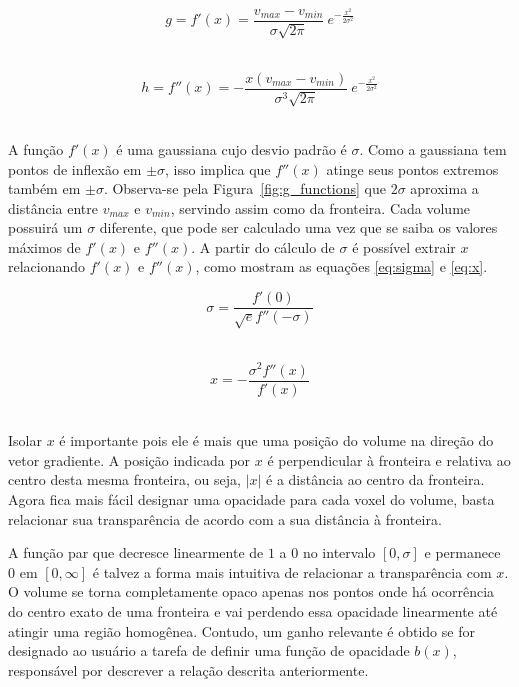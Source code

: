 \begin{equation} \label{eq:first}
	g = f'(x) = \frac{v_{max} - v_{min}}{\sigma\sqrt{2\pi}}\ e^{-\frac{x^{2}}{2\sigma^{2}}}
\end{equation} \

\begin{equation} \label{eq:second}
	h = f''(x) = -\frac{x(v_{max} - v_{min})}{\sigma^{3}\sqrt{2\pi}}\ e^{-\frac{x^{2}}{2\sigma^{2}}}
\end{equation} \

	A função $f'(x)$ é uma gaussiana cujo desvio padrão é $\sigma$. Como a gaussiana tem pontos de inflexão em $\pm\sigma$, isso implica que $f''(x)$ atinge seus pontos extremos também em $\pm\sigma$. Observa-se pela Figura~\ref{fig:g_functions} que $2\sigma$ aproxima a distância entre $v_{max}$ e $v_{min}$, servindo assim como  da fronteira. Cada volume possuirá um $\sigma$ diferente, que pode ser calculado uma vez que se saiba os valores máximos de $f'(x)$ e $f''(x)$. A partir do cálculo de $\sigma$ é possível extrair $x$ relacionando $f'(x)$ e $f''(x)$, como mostram as equações \eqref{eq:sigma} e \eqref{eq:x}.
	
\begin{equation} \label{eq:sigma}
	\sigma = \frac{f'(0)}{\sqrt{e}f''(-\sigma)}
\end{equation} \

\begin{equation} \label{eq:x}
	x = -\frac{\sigma^{2}f''(x)}{f'(x)}
\end{equation} \

	Isolar $x$ é importante pois ele é mais que uma posição do volume na direção do vetor gradiente. A posição indicada por $x$ é perpendicular à fronteira e relativa ao centro desta mesma fronteira, ou seja, $|x|$ é a distância ao centro da fronteira. Agora fica mais fácil designar uma opacidade para cada voxel do volume, basta relacionar sua transparência de acordo com a sua distância à fronteira.
	
	A função par que decresce linearmente de $1$ a $0$ no intervalo $[0,\sigma]$ e permanece $0$ em $[0, \infty]$ é talvez a forma mais intuitiva de relacionar a transparência com $x$. O volume se torna completamente opaco apenas nos pontos onde há ocorrência do centro exato de uma fronteira e vai perdendo essa opacidade linearmente até atingir uma região homogênea. Contudo, um ganho relevante é obtido se for designado ao usuário a tarefa de definir uma função de opacidade $b(x)$, responsável por descrever a relação  descrita anteriormente.
	
